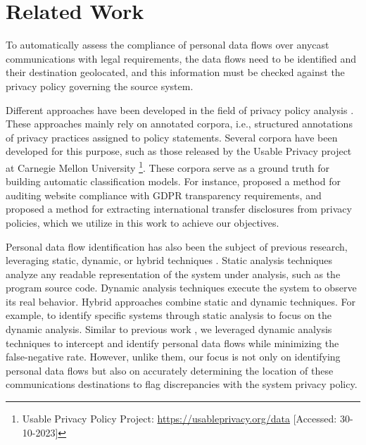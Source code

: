 \documentclass[preprint,12pt]{elsarticle}
\begin{document}
\section{Related Work}\label{sec:RelatedWork}
To automatically assess the compliance of personal data flows over anycast communications with legal requirements, the data flows need to be identified and their destination geolocated, and this information must be checked against the privacy policy governing the source system.

Different approaches have been developed in the field of privacy policy analysis \cite{DelAlamo2022APolicies}. These approaches mainly rely on annotated corpora, i.e., structured annotations of privacy practices assigned to policy statements. Several corpora have been developed for this purpose, such as those released by the Usable Privacy project at Carnegie Mellon University \footnote{Usable Privacy Policy Project: \url{https://usableprivacy.org/data} [Accessed: 30-10-2023]}. These corpora serve as a ground truth for building automatic classification models. For instance, \cite{Lin2022PrivacyPolicies} proposed a method for auditing website compliance with GDPR transparency requirements, and  \cite{Guaman2023AutomatedApplications} proposed a method for extracting international transfer disclosures from privacy policies, which we utilize in this work to achieve our objectives.

Personal data flow identification has also been the subject of previous research, leveraging static, dynamic, or hybrid techniques \cite{DelAlamo2021PrivacyStudy}. Static analysis techniques analyze any readable representation of the system under analysis, such as the program source code. Dynamic analysis techniques execute the system to observe its real behavior. Hybrid approaches combine static and dynamic techniques. For example, to identify specific systems through static analysis to focus on the dynamic analysis. Similar to previous work \cite{Guaman2023AutomatedApplications, Lin2022PrivacyPolicies}, we leveraged dynamic analysis techniques to intercept and identify personal data flows while minimizing the false-negative rate. However, unlike them, our focus is not only on identifying personal data flows but also on accurately determining the location of these communications destinations to flag discrepancies with the system privacy policy. 
\end{document}
